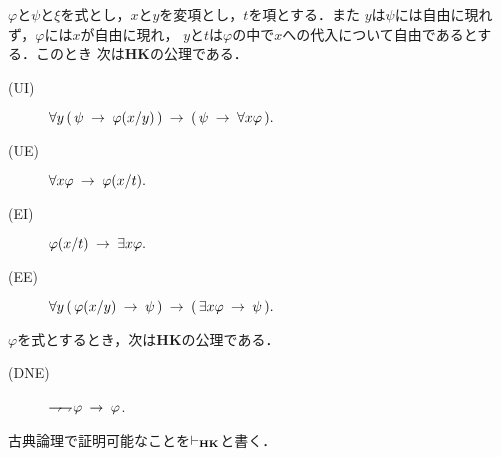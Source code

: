 	\begin{screen}
		\begin{logicalaxm}[{\bf HK}の公理(量化)]
			$\varphi$と$\psi$と$\xi$を式とし，$x$と$y$を変項とし，$t$を項とする．また
			$y$は$\psi$には自由に現れず，$\varphi$には$x$が自由に現れ，
			$y$と$t$は$\varphi$の中で$x$への代入について自由であるとする．このとき
			次は{\bf HK}の公理である．
			\begin{description}
				\item[(UI)] $\forall y\, (\, \psi \hspace{0.25em}\rightarrow\hspace{0.25em} \varphi(x/y)\, ) 
					\hspace{0.25em}\rightarrow\hspace{0.25em} (\, \psi \hspace{0.25em}\rightarrow\hspace{0.25em} \forall x \varphi\, ).$
				
				\item[(UE)] $\forall x \varphi \hspace{0.25em}\rightarrow\hspace{0.25em} \varphi(x/t).$
				
				\item[(EI)] $\varphi(x/t) \hspace{0.25em}\rightarrow\hspace{0.25em} \exists x \varphi.$
				
				\item[(EE)] $\forall y\, (\, \varphi(x/y) \hspace{0.25em}\rightarrow\hspace{0.25em} \psi\, )
						\hspace{0.25em}\rightarrow\hspace{0.25em} (\, \exists x \varphi \hspace{0.25em}\rightarrow\hspace{0.25em} \psi\, ).$
			\end{description}
		\end{logicalaxm}
	\end{screen}
	
	\begin{screen}
		\begin{logicalaxm}
			$\varphi$を式とするとき，次は{\bf HK}の公理である．
			\begin{description}
				\item[(DNE)] $\rightharpoondown\hspace{-0.25em} \rightharpoondown\hspace{-0.25em} \varphi \hspace{0.25em}\rightarrow\hspace{0.25em} \varphi$.
			\end{description}
		\end{logicalaxm}
	\end{screen}
	
	古典論理で証明可能なことを$\vdash_{{\scriptsize \mbox{{\bf HK}}}}$と書く．
	
